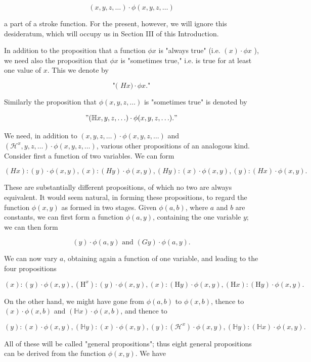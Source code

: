 \documentclass[10pt]{article}
\begin{document}
$$
(x, y, z, \ldots) \cdot \phi(x, y, z, \ldots)
$$

a part of a stroke function. For the present, however, we will ignore this desideratum, which will occupy us in Section III of this Introduction.

In addition to the proposition that a function $\phi x$ is "always true" (i.e. $(x) \cdot \phi x$ ), we need also the proposition that $\phi x$ is "sometimes true," i.e. is true for at least one value of $x$. This we denote by

$$
\text { "( } H x) \cdot \phi x \text {." }
$$

Similarly the proposition that $\phi(x, y, z, \ldots)$ is "sometimes true" is denoted by

$$
"(\mathbb{H} x, y, z, \ldots) \cdot \phi(x, y, z, \ldots) . "
$$

We need, in addition to $(x, y, z, \ldots) \cdot \phi(x, y, z, \ldots)$ and $\left(\mathcal{H}^{x}, y, z, \ldots\right) \cdot \phi(x, y, z, \ldots)$, various other propositions of an analogous kind. Consider first a function of two variables. We can form

$$
(H x):(y) \cdot \phi(x, y),(x):(H y) \cdot \phi(x, y),(H y):(x) \cdot \phi(x, y),(y):(H x) \cdot \phi(x, y) .
$$

These are substantially different propositions, of which no two are always equivalent. It would seem natural, in forming these propositions, to regard the function $\phi(x, y)$ as formed in two stages. Given $\phi(a, b)$, where $a$ and $b$ are constants, we can first form a function $\phi(a, y)$, containing the one variable $y$; we can then form

$$
(y) \cdot \phi(a, y) \text { and }(G y) \cdot \phi(a, y) .
$$

We can now vary $a$, obtaining again a function of one variable, and leading to the four propositions

$$
(x):(y) \cdot \phi(x, y),\left(\mathrm{H}^{x}\right):(y) \cdot \phi(x, y),(x):(\mathrm{H} y) \cdot \phi(x, y),(\mathrm{H} x):(\mathrm{H} y) \cdot \phi(x, y) .
$$

On the other hand, we might have gone from $\phi(a, b)$ to $\phi(x, b)$, thence to $(x) \cdot \phi(x, b)$ and $(\mathbb{H} x) \cdot \phi(x, b)$, and thence to

$$
(y):(x) \cdot \phi(x, y),(\mathbb{H} y):(x) \cdot \phi(x, y),(y):\left(\mathcal{H}^{x}\right) \cdot \phi(x, y),(\mathbb{H} y):(\mathbb{H} x) \cdot \phi(x, y) .
$$

All of these will be called "general propositions"; thus eight general propositions can be derived from the function $\phi(x, y)$. We have
\end{document}
